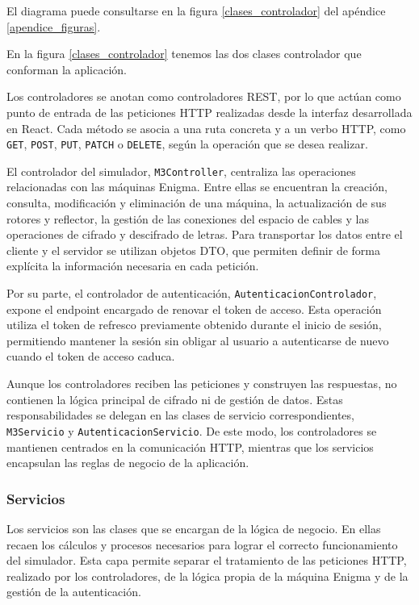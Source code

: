 El diagrama puede consultarse en la figura \ref{clases_controlador} del apéndice \ref{apendice_figuras}.

En la figura \ref{clases_controlador} tenemos las dos clases controlador que conforman la aplicación.

Los controladores se anotan como controladores REST, por lo que actúan como punto de entrada de las peticiones HTTP realizadas desde la interfaz desarrollada en React. Cada método se asocia a una ruta concreta y a un verbo HTTP, como \texttt{GET}, \texttt{POST}, \texttt{PUT}, \texttt{PATCH} o \texttt{DELETE}, según la operación que se desea realizar.

El controlador del simulador, \texttt{M3Controller}, centraliza las operaciones relacionadas con las máquinas Enigma. Entre ellas se encuentran la creación, consulta, modificación y eliminación de una máquina, la actualización de sus rotores y reflector, la gestión de las conexiones del espacio de cables y las operaciones de cifrado y descifrado de letras. Para transportar los datos entre el cliente y el servidor se utilizan objetos DTO, que permiten definir de forma explícita la información necesaria en cada petición.

Por su parte, el controlador de autenticación, \texttt{AutenticacionControlador}, expone el endpoint encargado de renovar el token de acceso. Esta operación utiliza el token de refresco previamente obtenido durante el inicio de sesión, permitiendo mantener la sesión sin obligar al usuario a autenticarse de nuevo cuando el token de acceso caduca.

Aunque los controladores reciben las peticiones y construyen las respuestas, no contienen la lógica principal de cifrado ni de gestión de datos. Estas responsabilidades se delegan en las clases de servicio correspondientes, \texttt{M3Servicio} y \texttt{AutenticacionServicio}. De este modo, los controladores se mantienen centrados en la comunicación HTTP, mientras que los servicios encapsulan las reglas de negocio de la aplicación.

\subsubsection{Servicios}

Los servicios son las clases que se encargan de la lógica de negocio. En ellas recaen los cálculos y procesos necesarios para lograr el correcto funcionamiento del simulador. Esta capa permite separar el tratamiento de las peticiones HTTP, realizado por los controladores, de la lógica propia de la máquina Enigma y de la gestión de la autenticación.

